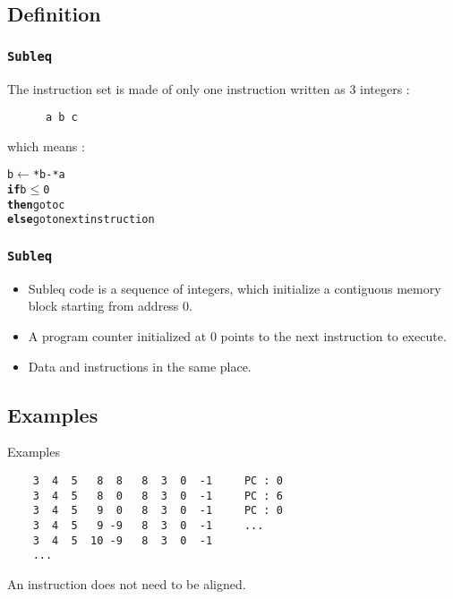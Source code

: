 \documentclass{beamer}
\begin{document}
\subsection{Definition}
\begin{frame}[fragile]
    \frametitle{\texttt{Subleq}}
    The instruction set is made of only one instruction written as 3
    integers :
    \\[11pt]
    \begin{verbatim}
      a b c
    \end{verbatim}
    which means :

    \begin{alltt}
       b \(\leftarrow\) *b - *a
      {\bf if} b \(\leq\) 0
      {\bf then} go to c
      {\bf else} go to next instruction
    \end{alltt}

\end{frame}

\begin{frame}
  \frametitle{\texttt{Subleq}}
  \begin{itemize}
    \item Subleq code is a sequence of integers, which initialize
      a contiguous memory block starting from address 0.
    \item A program counter initialized at 0 points to the next
      instruction to execute.
    \item Data and instructions in the same place.
  \end{itemize}
\end{frame}

\subsection{Examples}
\begin{frame}[fragile]{Examples}
  \begin{verbatim}
    3  4  5   8  8   8  3  0  -1     PC : 0
    3  4  5   8  0   8  3  0  -1     PC : 6
    3  4  5   9  0   8  3  0  -1     PC : 0
    3  4  5   9 -9   8  3  0  -1     ...
    3  4  5  10 -9   8  3  0  -1
    ...
  \end{verbatim}
  An instruction does not need to be aligned.
\end{frame}
\end{document}
